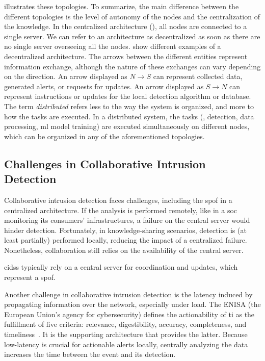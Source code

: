  illustrates these topologies.
To summarize, the main difference between the different topologies is the level of autonomy of the nodes and the centralization of the knowledge.
In the centralized architecture (), all nodes are connected to a single server.
We can refer to an architecture as decentralized as soon as there are no single server overseeing all the nodes.
 show different examples of a decentralized architecture.
The arrows between the different entities represent information exchange, although the nature of these exchanges can vary depending on the direction.
An arrow displayed as $N \rightarrow S$ can represent collected data, generated alerts, or requests for updates.
An arrow displayed as $S \rightarrow N$ can represent instructions or updates for the local detection algorithm or database.
The term \emph{distributed} refers less to the way the system is organized, and more to how the tasks are executed.
In a distributed system, the tasks (\eg, detection, data processing, \gls{ml} model training) are executed simultaneously on different nodes, which can be organized in any of the aforementioned topologies.


\subsection{Challenges in Collaborative Intrusion Detection\label{sec:bg.collab.challenges}}

Collaborative intrusion detection faces challenges, including the \gls{spof} in a centralized architecture.
If the analysis is performed remotely, like in a \gls{soc} monitoring its consumers' infrastructures, a failure on the central server would hinder detection.
Fortunately, in knowledge-sharing scenarios, detection is (at least partially) performed locally, reducing the impact of a centralized failure.
Nonetheless, collaboration still relies on the availability of the central server.

\begin{challenge}
  \Glspl{cids} typically rely on a central server for coordination and updates, which represent a \acrfull{spof}.
  \label{chall:spof}
\end{challenge}

Another challenge in collaborative intrusion detection is the latency induced by propagating information over the network, especially under load.
The ENISA (the European Union's agency for cybersecurity) defines the actionability of \gls{ti} as the fulfillment of five criteria: relevance, digestibility, accuracy, completeness, and timeliness~\cite{ENISA2014}.
It is the supporting architecture that provides the latter.
Because low-latency is crucial for actionable alerts locally, centrally analyzing the data increases the time between the event and its detection.

